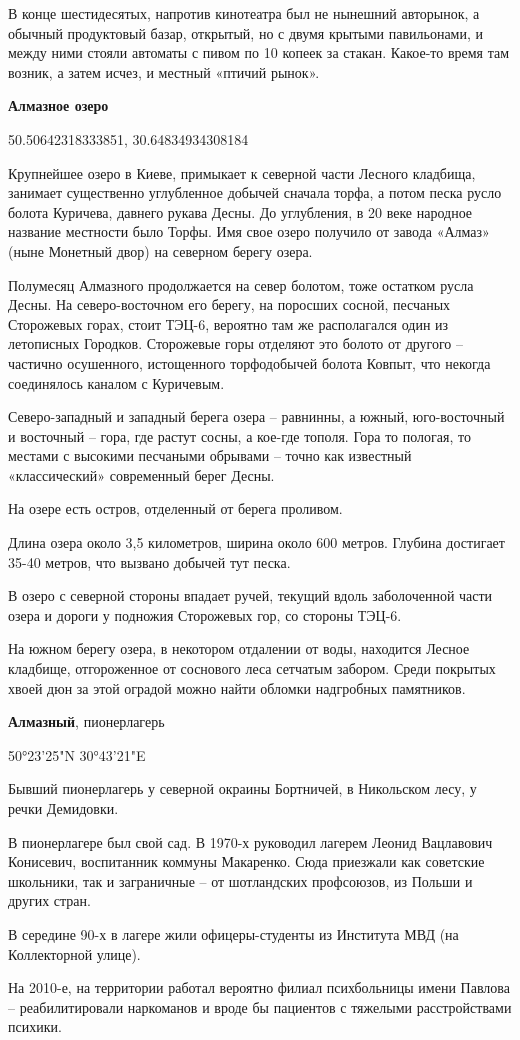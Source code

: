 В конце шестидесятых, напротив кинотеатра был не нынешний авторынок, а обычный продуктовый базар, открытый, но с двумя крытыми павильонами, и между ними стояли автоматы с пивом по 10 копеек за стакан. Какое-то время там возник, а затем исчез, и местный «птичий рынок».\\

\medskip

\textbf{Алмазное озеро}

50.50642318333851, 30.64834934308184

Крупнейшее озеро в Киеве, примыкает к северной части Лесного кладбища, занимает существенно углубленное добычей сначала торфа, а потом песка русло болота Куричева, давнего рукава Десны. До углубления, в 20 веке народное название местности было Торфы. Имя свое озеро получило от завода «Алмаз» (ныне Монетный двор) на северном берегу озера.

Полумесяц Алмазного продолжается на север болотом, тоже остатком русла Десны. На северо-восточном его берегу, на поросших сосной, песчаных Сторожевых горах, стоит ТЭЦ-6, вероятно там же располагался один из летописных Городков. Сторожевые горы отделяют это болото от другого – частично осушенного, истощенного торфодобычей болота Ковпыт, что некогда соединялось каналом с Куричевым.

Северо-западный и западный берега озера – равнинны, а южный, юго-восточный и восточный – гора, где растут сосны, а кое-где тополя. Гора то пологая, то местами с высокими песчаными обрывами – точно как известный «классический» современный берег Десны. 

На озере есть остров, отделенный от берега проливом.

Длина озера около 3,5 километров, ширина около 600 метров. Глубина достигает 35-40 метров, что вызвано добычей тут песка.

В озеро с северной стороны впадает ручей, текущий вдоль заболоченной части озера и дороги у подножия Сторожевых гор, со стороны ТЭЦ-6.

На южном берегу озера, в некотором отдалении от воды, находится Лесное кладбище, отгороженное от соснового леса сетчатым забором. Среди покрытых хвоей дюн за этой оградой можно найти обломки надгробных памятников.\\

\medskip


\textbf{Алмазный}, пионерлагерь

50°23'25"N 30°43'21"E

Бывший пионерлагерь у северной окраины Бортничей, в Никольском лесу, у речки Демидовки.

В пионерлагере был свой сад. В 1970-х руководил лагерем Леонид Вацлавович Конисевич, воспитанник коммуны Макаренко. Сюда приезжали как советские школьники, так и заграничные – от шотландских профсоюзов, из Польши и других стран.

В середине 90-х в лагере жили офицеры-студенты из Института МВД (на Коллекторной улице).

На 2010-е, на территории работал вероятно филиал психбольницы имени Павлова – реабилитировали наркоманов и вроде бы пациентов с тяжелыми расстройствами психики.
